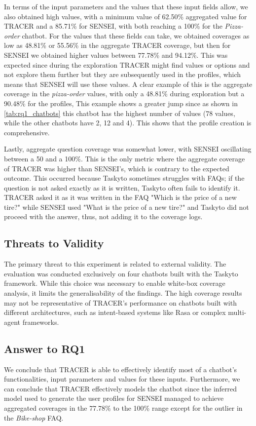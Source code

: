 In terms of the input parameters and
the values that these input fields allow,
we also obtained high values,
with a minimum value of 62.50\% aggregated value for TRACER
and a 85.71\% for SENSEI,
with both reaching a 100\% for the \textit{Pizza-order} chatbot.
For the values that these fields can take, we obtained
coverages as low as 48.81\% or 55.56\% in the aggregate \ac{TRACER} coverage,
but then for SENSEI we obtained higher values between 77.78\% and 94.12\%.
This was expected since during the exploration
TRACER might find values or options and not explore them further
but they are subsequently used in the profiles,
which means that SENSEI will use these values.
A clear example of this is the aggregate coverage in the \textit{pizza-order} values,
with only a 48.81\% during exploration but a 90.48\% for the profiles,
This example shows a greater jump since as shown in \autoref{tab:rq1_chatbots}
this chatbot has the highest number of values
(78 values, while the other chatbots have 2, 12 and 4).
This shows that the profile creation is comprehensive.

Lastly, aggregate question coverage was somewhat lower,
with SENSEI oscillating between a 50 and a 100\%.
This is the only metric where the aggregate coverage of TRACER
was higher than SENSEI's, which is contrary to the expected outcome.
This occurred because Taskyto sometimes struggles with FAQs;
if the question is not asked exactly as it is written,
Taskyto often fails to identify it.
\ac{TRACER} asked it as it was written in the FAQ
"Which is the price of a new tire?"
while SENSEI used "What is the price of a new tire?"
and Taskyto did not proceed with the answer, thus,
not adding it to the coverage logs.

\subsection{Threats to Validity}
The primary threat to this experiment
is related to external validity.
The evaluation was conducted exclusively
on four chatbots built with the Taskyto framework.
While this choice was necessary
to enable white-box coverage analysis,
it limits the generalisability of the findings.
The high coverage results
may not be representative of TRACER's performance
on chatbots built with different architectures,
such as intent-based systems like Rasa
or complex multi-agent frameworks.

\subsection{Answer to RQ1}

We conclude that \ac{TRACER} is able to effectively identify
most of a chatbot's functionalities, input parameters and values for these inputs.
Furthermore, we can conclude that TRACER effectively models the chatbot
since the inferred model used to generate the user profiles for SENSEI
managed to achieve aggregated coverages in the 77.78\% to the 100\% range
except for the outlier in the \textit{Bike-shop} FAQ.
